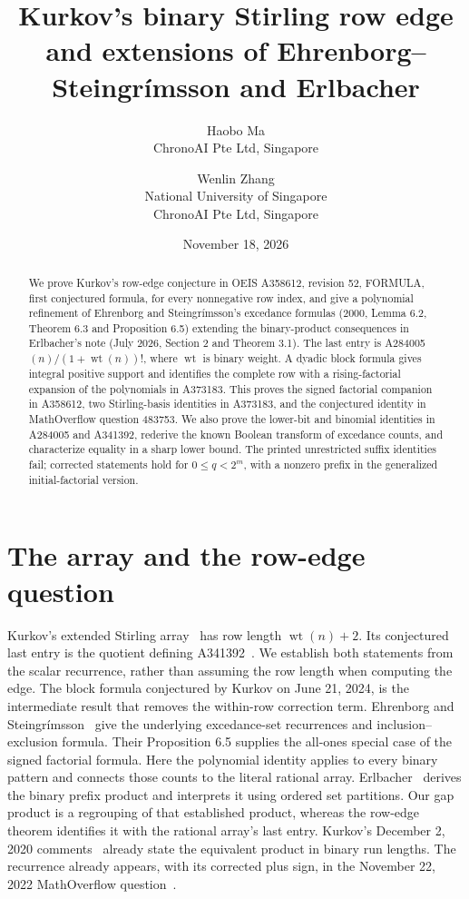 \documentclass[11pt]{article}
\title{Kurkov's binary Stirling row edge and extensions of
Ehrenborg--Steingr\'imsson and Erlbacher}
\author{Haobo Ma\\\small ChronoAI Pte Ltd, Singapore
\and Wenlin Zhang\\\small National University of Singapore\\\small ChronoAI Pte Ltd, Singapore}
\date{November 18, 2026}
\newcommand{\wt}{\operatorname{wt}}
\begin{document}
\maketitle
\begin{abstract}
We prove Kurkov's row-edge conjecture in OEIS A358612, revision 52,
FORMULA, first conjectured formula, for every nonnegative row index,
and give a polynomial refinement of Ehrenborg and Steingr\'imsson's
excedance formulas (2000, Lemma 6.2, Theorem 6.3 and Proposition 6.5)
extending the binary-product consequences in Erlbacher's note (July 2026,
Section 2 and Theorem 3.1).
The last entry is A284005$(n)/(1+\wt(n))!$, where $\wt$ is binary weight.
A dyadic block formula gives integral positive support and identifies
the complete row with a rising-factorial expansion of the polynomials
in A373183. This proves the signed factorial companion in A358612,
two Stirling-basis identities in A373183, and the conjectured identity
in MathOverflow question 483753. We also prove the lower-bit and binomial
identities in A284005 and A341392, rederive the known Boolean transform
of excedance counts, and characterize equality in a sharp lower bound.
The printed unrestricted suffix identities fail; corrected statements
hold for $0\leq q<2^m$, with a nonzero prefix in the generalized
initial-factorial version.
\end{abstract}

\section{The array and the row-edge question}
Kurkov's extended Stirling array~\cite{array} has row length
$\wt(n)+2$. Its conjectured last entry is the quotient defining
A341392~\cite{edge}. We establish both statements from the scalar
recurrence, rather than assuming the row length when computing the edge.
The block formula conjectured by Kurkov on June 21, 2024, is the
intermediate result that removes the within-row correction term.
Ehrenborg and Steingr\'imsson~\cite{excedance} give the underlying
excedance-set recurrences and inclusion--exclusion formula. Their
Proposition 6.5 supplies the all-ones special case of the signed
factorial formula. Here the polynomial identity applies to every binary
pattern and connects those counts to the literal rational array.
Erlbacher~\cite[Section 2 and Theorem 3.1]{erlbacher} derives the
binary prefix product and interprets it using ordered set partitions.
Our gap product is a regrouping of that established product, whereas
the row-edge theorem identifies it with the rational array's last entry.
Kurkov's December 2, 2020 comments~\cite{comments} already state the
equivalent product in binary run lengths.
The recurrence already appears, with its corrected plus sign, in the
November 22, 2022 MathOverflow question~\cite{precursor}.
\end{document}
